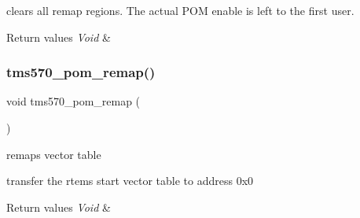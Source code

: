 clears all remap regions. The actual P\+OM enable is left to the first user.


\begin{DoxyRetVals}{Return values}
{\em Void} & \\
\hline
\end{DoxyRetVals}
\mbox{\label{tms570-pom_8h_aa5484712012d1e84f9422450a76fd6d4}} 
\subsubsection{\texorpdfstring{tms570\_pom\_remap()}{tms570\_pom\_remap()}}
{\footnotesize\ttfamily void tms570\+\_\+pom\+\_\+remap (\begin{DoxyParamCaption}\item[{void}]{ }\end{DoxyParamCaption})}



remaps vector table 

transfer the rtems start vector table to address 0x0


\begin{DoxyRetVals}{Return values}
{\em Void} & \\
\hline
\end{DoxyRetVals}
